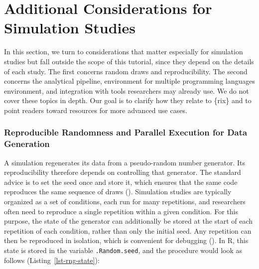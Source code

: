 \documentclass[
  man,
  longtable,
  nolmodern,
  notxfonts,
  notimes,
  colorlinks=true,linkcolor=blue,citecolor=blue,urlcolor=blue]{apa7}
\begin{document}
\section{Additional Considerations for Simulation
Studies}\label{additional-considerations-for-simulation-studies}

In this section, we turn to considerations that matter especially for
simulation studies but fall outside the scope of this tutorial, since
they depend on the details of each study. The first concerns random
draws and reproducibility. The second concerns the analytical pipeline,
environment for multiple programming languages environment, and
integration with tools researchers may already use. We do not cover
these topics in depth. Our goal is to clarify how they relate to \{rix\}
and to point readers toward resources for more advanced use cases.

\subsubsection{Reproducible Randomness and Parallel Execution for Data
Generation}\label{reproducible-randomness-and-parallel-execution-for-data-generation}

A simulation regenerates its data from a pseudo-random number generator.
Its reproducibility therefore depends on controlling that generator. The
standard advice is to set the seed once and store it, which ensures that
the same code reproduces the same sequence of draws
(). Simulation
studies are typically organized as a set of conditions, each run for
many repetitions, and researchers often need to reproduce a single
repetition within a given condition. For this purpose, the state of the
generator can additionally be stored at the start of each repetition of
each condition, rather than only the initial seed. Any repetition can
then be reproduced in isolation, which is convenient for debugging
(). In R, this
state is stored in the variable \texttt{.Random.seed}, and the procedure
would look as follows (Listing~\ref{lst-rng-state}):
\end{document}
